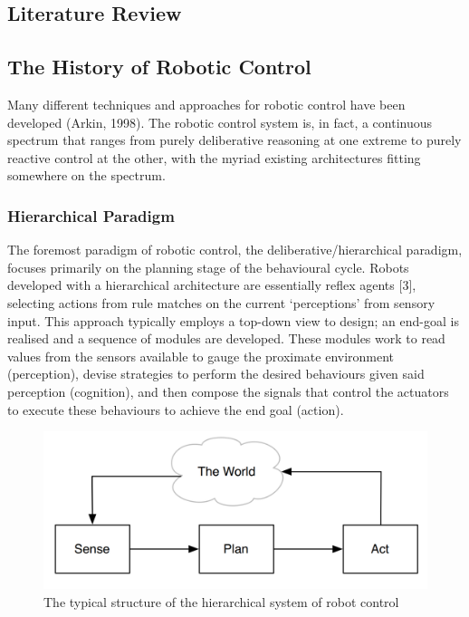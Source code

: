 \documentclass{article}
\begin{document}
	\begin{multicols}{2}
    \section{Literature Review}
	\subsection{The History of Robotic Control}
	Many different techniques and approaches for robotic control have been developed (Arkin, 1998). The robotic control system is, in fact, a continuous spectrum that ranges from purely deliberative reasoning at one extreme to purely reactive control at the other, with the myriad existing architectures fitting somewhere on the spectrum.
	

	\subsubsection{Hierarchical Paradigm}
	The foremost paradigm of robotic control, the deliberative/hierarchical paradigm, focuses primarily on the planning stage of the behavioural cycle. Robots developed with a hierarchical architecture are essentially reflex agents [3], selecting actions from rule matches on the current ‘perceptions’ from sensory input. This approach typically employs a top-down view to design; an end-goal is realised and a sequence of modules are developed. These modules work to read values from the sensors available to gauge the proximate environment (perception), devise strategies to perform the desired behaviours given said perception (cognition), and then compose the signals that control the actuators to execute these behaviours to achieve the end goal (action).

	\begin{figure}[h!]
	\centering
	\includegraphics[width=0.8\linewidth]{LiteratureReview2}
	\caption{The typical structure of the hierarchical system of robot control}
	\end{figure}
	

\end{multicols}
\end{document}
